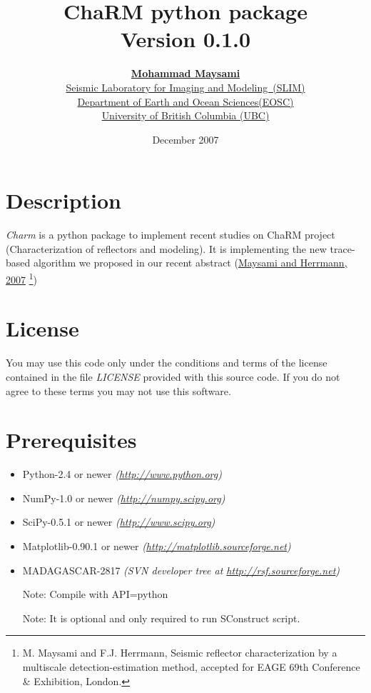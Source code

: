 \documentclass[12pt,titlepage]{article}
\title{\LARGE{\textbf{ChaRM python package}} \\[10pt] 
\normalsize{Version 0.1.0}}
\author{ \textbf{\href{mailto:mmaysami@eos.ubc.ca}{Mohammad
      Maysami}}\\[15pt] 
\normalsize{\href{http://slim.eos.ubc.ca}{Seismic Laboratory for
    Imaging and Modeling~(SLIM)}}\\ 
\normalsize{\href{http://www.eos.ubc.ca}{Department of Earth and Ocean
    Sciences(EOSC)}}\\ 
\normalsize{\href{http://www.ubc.ca}{University of British Columbia (UBC)}}\\ }
\date{December 2007}
\begin{document}
\maketitle
%
%
\section*{Description}
\textit{Charm} is a python package to implement recent studies on
ChaRM project (Characterization of reflectors and modeling). It is
implementing the new trace-based algorithm we proposed in our recent
abstract
(\href{http://slim.eos.ubc.ca/?module=articles&func=display&ptid=10&aid=119}{Maysami  and Herrmann, 2007} 
\footnote{M. Maysami and F.J. Herrmann, Seismic
  reflector characterization by a multiscale detection-estimation
  method, accepted for EAGE 69th Conference \& Exhibition, London.})
%
%
\section*{License}
You may use this code only under the conditions and terms of the
license contained in the file \textit{LICENSE} provided with this
source code. If you do not agree to these terms you may not use this
software.
%
%	
\section*{Prerequisites}
\begin{itemize}
\item Python-2.4 or newer
  \textit{(\href{http://www.python.org/}{\small{http://www.python.org}})}

\item NumPy-1.0 or newer
  \textit{(\href{http://numpy.scipy.org/}{\small{http://numpy.scipy.org}})}

\item SciPy-0.5.1 or newer
  \textit{(\href{http://www.scipy.org/}{\small{http://www.scipy.org}})}

\item Matplotlib-0.90.1 or newer
  \textit{(\href{http://matplotlib.sourceforge.net/}{\small{http://matplotlib.sourceforge.net}})}

\item MADAGASCAR-2817 \textit{(SVN developer tree at
    \href{http://rsf.sourceforge.net/}{\small{http://rsf.sourceforge.net}})}

\quad Note: Compile with API=python


\quad Note: It is optional and only required to run SConstruct script.
\end{itemize}
%
%
\end{document}
